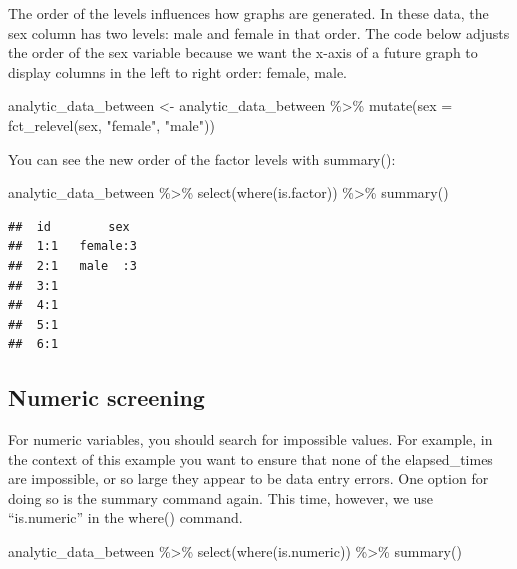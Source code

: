 \documentclass[
]{krantz}
\makeatletter
\newenvironment{Shaded}{\begin{snugshade}}{\end{snugshade}}
\newcommand{\AttributeTok}[1]{\textcolor[rgb]{0.61,0.61,0.61}{#1}}
\newcommand{\FunctionTok}[1]{\textcolor[rgb]{0,0,0}{#1}}
\newcommand{\NormalTok}[1]{#1}
\newcommand{\OtherTok}[1]{\textcolor[rgb]{0.37,0.37,0.37}{#1}}
\newcommand{\SpecialCharTok}[1]{\textcolor[rgb]{0,0,0}{#1}}
\newcommand{\StringTok}[1]{\textcolor[rgb]{0.5,0.5,0.5}{#1}}
\newenvironment{kframe}{%
\medskip{}
\setlength{\fboxsep}{.8em}
 \def\at@end@of@kframe{}%
 \ifinner\ifhmode%
  \def\at@end@of@kframe{\end{minipage}}%
  \begin{minipage}{\columnwidth}%
 \fi\fi%
 \def\FrameCommand##1{\hskip\@totalleftmargin \hskip-\fboxsep
 \colorbox{shadecolor}{##1}\hskip-\fboxsep
     \hskip-\linewidth \hskip-\@totalleftmargin \hskip\columnwidth}%
 \MakeFramed {\advance\hsize-\width
   \@totalleftmargin\z@ \linewidth\hsize
   \@setminipage}}%
 {\par\unskip\endMakeFramed%
 \at@end@of@kframe}
\renewenvironment{Shaded}{\begin{kframe}}{\end{kframe}}
\makeatother
\begin{document}
The order of the levels influences how graphs are generated. In these data, the sex column has two levels: male and female in that order. The code below adjusts the order of the sex variable because we want the x-axis of a future graph to display columns in the left to right order: female, male.

\begin{Shaded}
\begin{Highlighting}[]
\NormalTok{analytic\_data\_between }\OtherTok{\textless{}{-}}\NormalTok{ analytic\_data\_between }\SpecialCharTok{\%\textgreater{}\%}
  \FunctionTok{mutate}\NormalTok{(}\AttributeTok{sex =} \FunctionTok{fct\_relevel}\NormalTok{(sex,}
                           \StringTok{"female"}\NormalTok{,}
                           \StringTok{"male"}\NormalTok{))}
\end{Highlighting}
\end{Shaded}

You can see the new order of the factor levels with summary():

\begin{Shaded}
\begin{Highlighting}[]
\NormalTok{analytic\_data\_between }\SpecialCharTok{\%\textgreater{}\%}
  \FunctionTok{select}\NormalTok{(}\FunctionTok{where}\NormalTok{(is.factor)) }\SpecialCharTok{\%\textgreater{}\%}
  \FunctionTok{summary}\NormalTok{()}
\end{Highlighting}
\end{Shaded}

\begin{verbatim}
##  id        sex   
##  1:1   female:3  
##  2:1   male  :3  
##  3:1             
##  4:1             
##  5:1             
##  6:1
\end{verbatim}

\hypertarget{numeric-screening-2}{%
\subsection{Numeric screening}\label{numeric-screening-2}}

For numeric variables, you should search for impossible values. For example, in the context of this example you want to ensure that none of the elapsed\_times are impossible, or so large they appear to be data entry errors. One option for doing so is the summary command again. This time, however, we use ``is.numeric'' in the where() command.

\begin{Shaded}
\begin{Highlighting}[]
\NormalTok{analytic\_data\_between }\SpecialCharTok{\%\textgreater{}\%}
  \FunctionTok{select}\NormalTok{(}\FunctionTok{where}\NormalTok{(is.numeric)) }\SpecialCharTok{\%\textgreater{}\%}
  \FunctionTok{summary}\NormalTok{()}
\end{Highlighting}
\end{Shaded}
\end{document}
